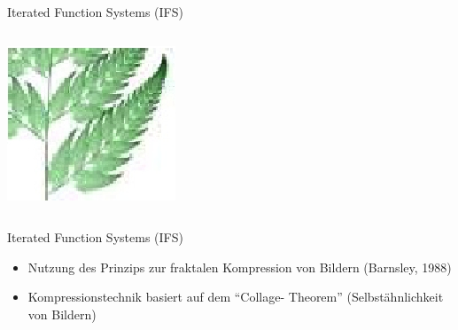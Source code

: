 \begin{frame}{Iterated Function Systems (IFS)}
\begin{itemize}
\begin{itemize}
\begin{columns}
    \includegraphics[width=\textwidth]{../images/BarnsleyFarnDetail.jpg}
  \end{columns}
 \end{itemize}
\end{itemize}

\end{frame}

\begin{frame}{Iterated Function Systems (IFS)}
  \begin{itemize}
    \item Nutzung des Prinzips zur fraktalen Kompression von
    Bildern (Barnsley, 1988)
    \item Kompressionstechnik basiert auf dem "`Collage-
    Theorem"' (Selbstähnlichkeit von Bildern)
  \end{itemize}
\end{frame}